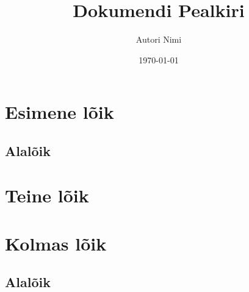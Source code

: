 \documentclass[10pt,a4paper, twoside]{article}
\title{Dokumendi Pealkiri}
\author{Autori Nimi}
\date{\today}
\begin{document}
\clearpage\maketitle
\thispagestyle{empty}
\pagebreak

\tableofcontents
\section{Esimene lõik}
\subsection{Alalõik}
\lipsum[1-6]

\section{Teine lõik}
\lipsum[1]

\section{Kolmas lõik}
\subsection{Alalõik}
\lipsum[1]
\end{document}
